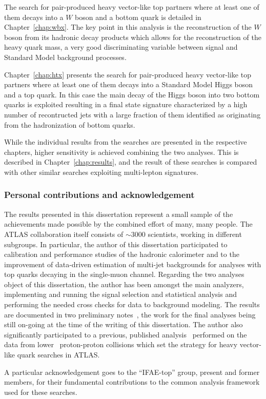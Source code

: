 The search for pair-produced heavy vector-like top partners
where at least one of them decays into a $W$ boson and a bottom
quark is detailed in Chapter~\ref{chap:wbx}. The key point in
this analysis is the reconstruction of the $W$ boson from its
hadronic decay products which allows for the reconstruction
of the heavy quark mass, a very good discriminating variable between
signal and Standard Model background processes.

Chapter~\ref{chap:htx} presents the search for 
pair-produced heavy vector-like top partners
where at least one of them decays into a Standard Model Higgs
boson and a top quark. In this case the main decay of the Higgs
boson into two bottom quarks is exploited resulting in a
final state signature characterized by a high number of recontructed
jets with a large fraction of them identified as originating
from the hadronization of bottom quarks.

While the individual results from the searches
are presented in the respective chapters, higher
sensitivity is achieved combining the two analyses.
This is described in Chapter~\ref{chap:results},
and the result of these searches is compared with
other similar searches exploiting multi-lepton signatures.






\subsubsection*{Personal contributions and acknowledgement}

The results presented in this dissertation represent
a small sample of the achievements made possible by
the combined effort of many, many people. The ATLAS
collaboration itself consists of $\sim$3000 scientists,
working in different subgroups. In particular,
the author of this dissertation participated to calibration
and performance studies of the hadronic calorimeter
and to the improvement of data-driven estimation of
multi-jet backgrounds for analyses with top quarks 
decaying in the single-muon channel. Regarding
the two analyses object of this dissertation, the author
has been amongst the main analyzers, implementing and
running the signal selection and statistical analysis and
performing the needed cross checks for data to background
modeling. %
The results are documented in two preliminary 
notes~\cite{ATLAS-CONF-2013-060,ATLAS-CONF-2013-018},
the work for the final analyses being still on-going at
the time of the writing of this dissertation.
The author also significantly participated to a previous,
published analysis~\cite{ATLAS:2012qe}
performed on the data from lower \cme\ 
proton-proton collisions which set the strategy for
heavy vector-like quark searches in ATLAS.

A particular acknowledgement goes to the ``IFAE-top''
group, present and former members, for their fundamental
contributions to the common analysis framework used
for these searches.

